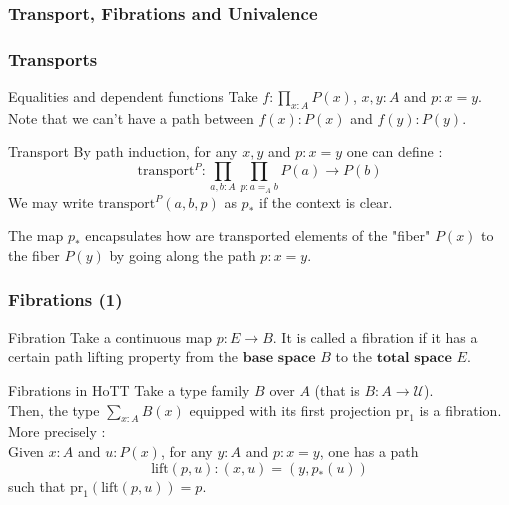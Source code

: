 \documentclass{beamer}
\begin{document}
    \subsubsection{Transport, Fibrations and Univalence}
    \begin{frame}
        \frametitle{Transports}
    \begin{exampleblock}{Equalities and dependent functions}
        Take $f : \prod_{x : A} P(x)$, $x,y : A$ and $p : x = y$. \\
        Note that we can't have a path between $f(x) : P(x)$ and $f(y) : P(y)$.
    \end{exampleblock}
    \pause
    \begin{alertblock}{Transport}
        By path induction, for any $x,y$ and $p : x=y$ one can define : 
        $$\mathrm{transport}^P : \prod_{a,b : A} \prod_{p : a=_A b} P(a) \rightarrow P(b)$$
        We may write $\mathrm{transport}^P(a,b,p)$ as $p_*$ if the context is clear.
    \end{alertblock}
    \pause
    \begin{example}
        The map $p_*$ encapsulates how are transported elements of the "fiber" $P(x)$ to the fiber $P(y)$ by going along the path $p : x=y$.
    \end{example}
    \end{frame}
    \begin{frame}
        \frametitle{Fibrations (1)}
        \begin{exampleblock}{Fibration}
            Take a continuous map $p : E \rightarrow B$. It is called a fibration if it has a certain path lifting property from the $\textbf{base space } B$ to the $\textbf{total space } E$. 
        \end{exampleblock}
        \pause
        \begin{alertblock}{Fibrations in HoTT}
            Take a type family $B$ over $A$ (that is $B : A \rightarrow \mathcal{U}$). \\ Then, the type $\sum_{x : A} B(x)$ equipped with its first projection $\mathrm{pr}_1$ is a fibration. \\
            \pause
            More precisely : \\
            Given $x : A$ and $u : P(x)$, for any $y : A$ and $p : x=y$, one has a path 
  $$\mathrm{lift}(p,u) : (x,u) = (y,p_*(u))$$
  such that $\mathrm{pr}_1(\mathrm{lift}(p,u)) = p$.
        \end{alertblock}
    \end{frame}
\end{document}
